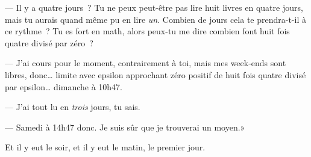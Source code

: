 --- Il y a quatre jours~? Tu ne peux peut-être pas lire huit livres en quatre jours, mais tu aurais quand même pu en lire \emph{un}. Combien de jours cela te prendra-t-il à ce rythme~? Tu es fort en math, alors peux-tu me dire combien font huit fois quatre divisé par zéro~?

--- J'ai cours pour le moment, contrairement à toi, mais mes week-ends sont libres, donc… limite avec epsilon approchant zéro positif de huit fois quatre divisé par epsilon… dimanche à 10h47.

--- J'ai tout lu en \emph{trois} jours, tu sais.

--- Samedi à 14h47 donc. Je suis sûr que je trouverai un moyen.»

Et il y eut le soir, et il y eut le matin, le premier jour.

